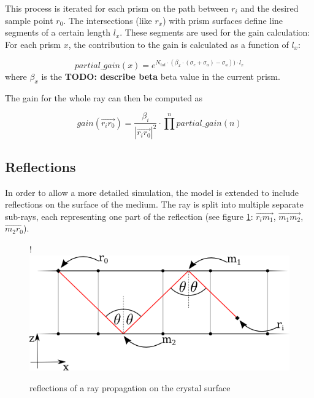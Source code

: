 This process is iterated for each prism on the path between $r_i$ and the
desired sample point $r_0$. The intersections (like $r_x$) with prism surfaces
define line segments of a certain length $l_x$. These segments are used for the
gain calculation: For each prism $x$, the contribution to the gain is calculated
as a function of $l_x$:

\begin{equation}
\label{eq:partial_gain}
  partial\_gain(x) = 
  e^{N_{tot} \cdot (\beta_x \cdot (\sigma_e + \sigma_a) - \sigma_a)) \cdot l_x}
\end{equation}
where $\beta_x$ is the \textbf{TODO: describe beta} beta value in the current
prism.

The gain for the whole ray can then be computed as

\begin{equation}
\label{eq:gain}
  gain(\overrightarrow{r_ir_0}) =  
  \frac{\beta_i}{ |\overrightarrow{r_ir_0}|^2} \cdot \prod^npartial\_gain(n) 
\end{equation}



\subsection{Reflections}
\label{subsec:reflections}

In order to allow a more detailed simulation, the model is extended to include
reflections on the surface of the medium. The ray is split into multiple
separate sub-rays, each representing one part of the reflection (see figure
\ref{graphic:reflections_2D}: $\overrightarrow{r_im_1}$,
$\overrightarrow{m_1m_2}$, $\overrightarrow{m_2r_0}$).


\begin{figure}[H]
  \centerline{
     {!} {\includegraphics{./graphics/reflections_1.png}}
  }
  \caption{reflections of a ray propagation on the crystal surface}
  \label{graphic:reflections_2D}
\end{figure}


